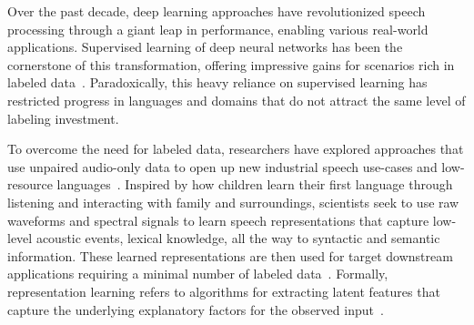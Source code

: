 Over the past decade, deep learning approaches have revolutionized speech processing
through a giant leap in performance, enabling various real-world applications.
Supervised learning of deep neural networks has been the cornerstone of this
transformation, offering impressive gains for scenarios rich in labeled
data~\cite{lecun2015deep, hinton2012deep, bourlard2012connectionist}. 
Paradoxically, this heavy reliance on supervised learning has restricted progress in
languages and domains that do not attract the same level of labeling
investment. 

To overcome the need for labeled data, researchers have explored approaches that use
unpaired audio-only data to open up new industrial speech use-cases and
low-resource languages~\cite{Kemp1999, csl01_limsi, ma_bbn_06}. Inspired by how
children learn their first language through listening and interacting with
family and surroundings, scientists seek to use raw waveforms and
spectral signals to learn speech representations that capture low-level
acoustic events, lexical knowledge, all the way to syntactic and semantic
information. These learned representations are then used for target downstream
applications requiring a minimal number of labeled data~\cite{Hinton_2007,
LeCun06atutorial, bengio_representation_2013}. 
Formally, representation learning refers to algorithms for extracting latent
features that capture the underlying explanatory factors for the observed
input~\cite{bengio_representation_2013}. 

